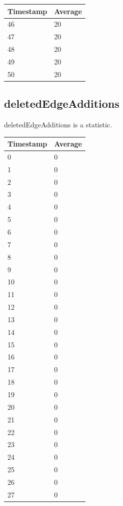 \begin{tabular}{|l||l|}
\hline
	\textbf{Timestamp} & \textbf{Average} \\ \hline
	46 & 20 \\ \hline
	47 & 20 \\ \hline
	48 & 20 \\ \hline
	49 & 20 \\ \hline
	50 & 20 \\ \hline
\end{tabular}

\subsection{deletedEdgeAdditions}
deletedEdgeAdditions is a statistic.

%
%
\begin{tabular}{|l||l|}
\hline
	\textbf{Timestamp} & \textbf{Average} \\ \hline
	0 & 0 \\ \hline
	1 & 0 \\ \hline
	2 & 0 \\ \hline
	3 & 0 \\ \hline
	4 & 0 \\ \hline
	5 & 0 \\ \hline
	6 & 0 \\ \hline
	7 & 0 \\ \hline
	8 & 0 \\ \hline
	9 & 0 \\ \hline
	10 & 0 \\ \hline
	11 & 0 \\ \hline
	12 & 0 \\ \hline
	13 & 0 \\ \hline
	14 & 0 \\ \hline
	15 & 0 \\ \hline
	16 & 0 \\ \hline
	17 & 0 \\ \hline
	18 & 0 \\ \hline
	19 & 0 \\ \hline
	20 & 0 \\ \hline
	21 & 0 \\ \hline
	22 & 0 \\ \hline
	23 & 0 \\ \hline
	24 & 0 \\ \hline
	25 & 0 \\ \hline
	26 & 0 \\ \hline
	27 & 0 \\ \hline

\end{tabular}
